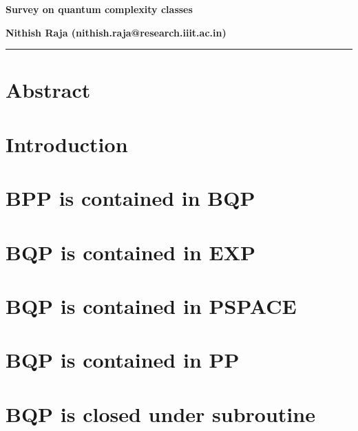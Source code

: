 



\noindent\textbf{\Large Survey on quantum complexity classes}
\vspace{2em}

\noindent
\textbf{Nithish Raja (nithish.raja@research.iiit.ac.in)}\\

\hrule

\section{Abstract}



\section{Introduction}



\section{BPP is contained in BQP}



\section{BQP is contained in EXP}



\section{BQP is contained in PSPACE}



\section{BQP is contained in PP}



\section{BQP is closed under subroutine}




